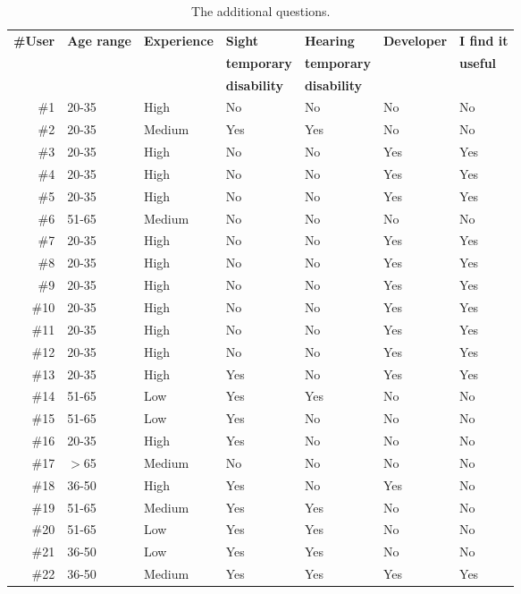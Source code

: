 \begin{table}
  \caption{The additional questions.}
 \label{tbl:additional_questions}
\footnotesize
\centering
 \begin{tabular}{r l l l l l l}
  \hline 
  \textbf{\#User} 	& \textbf{Age range} 	& \textbf{Experience} & \textbf{Sight} & \textbf{Hearing} & \textbf{Developer} & \textbf{I find it} \\
			&   			& 		      & \textbf{temporary}       & \textbf{temporary}	&	& \textbf{useful}\\
			& 			& 		      & \textbf{disability}	 & \textbf{disability} & & \\
  \hline
  \#1 & 20-35	& High		& No	& No	& No	& No	\\
  \#2 & 20-35 	& Medium	& Yes	& Yes	& No	& No	\\
  \#3 & 20-35 	& High		& No	& No	& Yes	& Yes	\\
  \#4 & 20-35 	& High		& No	& No	& Yes	& Yes	\\
  \#5 & 20-35 	& High		& No	& No	& Yes	& Yes	\\
  \#6 & 51-65 	& Medium	& No	& No	& No	& No	\\
  \#7 & 20-35 	& High		& No	& No	& Yes	& Yes	\\
  \#8 & 20-35 	& High		& No	& No	& Yes	& Yes	\\
  \#9 & 20-35 	& High		& No	& No	& Yes	& Yes	\\
  \#10 & 20-35 	& High		& No	& No	& Yes	& Yes	\\
  \#11 & 20-35 	& High		& No	& No	& Yes	& Yes	\\
  \#12 & 20-35 	& High		& No	& No	& Yes	& Yes	\\
  \#13 & 20-35 	& High		& Yes	& No	& Yes	& Yes	\\
  \#14 & 51-65 	& Low		& Yes	& Yes	& No	& No	\\
  \#15 & 51-65 	& Low		& Yes	& No	& No	& No	\\
  \#16 & 20-35 	& High		& Yes	& No	& No	& No	\\
  \#17 & $>$65 	& Medium	& No	& No	& No	& No	\\
  \#18 & 36-50 	& High		& Yes	& No	& Yes	& No	\\
  \#19 & 51-65 	& Medium	& Yes	& Yes	& No	& No	\\
  \#20 & 51-65 	& Low		& Yes	& Yes	& No	& No	\\
  \#21 & 36-50 	& Low		& Yes	& Yes	& No	& No	\\
  \#22 & 36-50 	& Medium	& Yes	& Yes	& Yes	& Yes	\\

\end{tabular}
\end{table}

